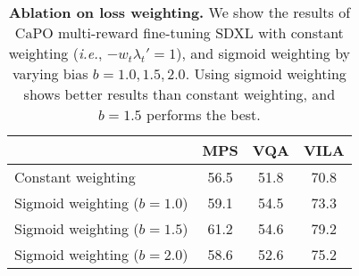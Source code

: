 \begin{table}[t]
\centering
\small
\vspace{-0.1in}
\centering\small
\begin{tabular}{l  ccc}
\toprule
 & MPS & VQA & VILA \\
\midrule
Constant weighting  & 56.5  & 51.8 & 70.8  \\
\midrule
Sigmoid weighting ($b=1.0$)  & 59.1 &	54.5 &73.3 \\
Sigmoid weighting ($b=1.5$)  & 61.2 & 54.6 & 79.2   \\
Sigmoid weighting ($b=2.0$)  & 58.6 & 52.6 & 75.2   \\
\bottomrule
\end{tabular}
\vspace{-2mm}
\caption{
\textbf{Ablation on loss weighting.} We show the results of CaPO multi-reward fine-tuning SDXL with constant weighting (\emph{i.e.}, $-w_t\lambda_t'=1$), and sigmoid weighting by varying bias $b=1.0, 1.5, 2.0$. Using sigmoid weighting shows better results than constant weighting, and $b=1.5$ performs the best.
}\label{tab:abl}
\end{table}